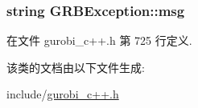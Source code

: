 \subsubsection[{\texorpdfstring{msg}{msg}}]{\setlength{\rightskip}{0pt plus 5cm}string G\+R\+B\+Exception\+::msg\hspace{0.3cm}{\ttfamily [private]}}\hypertarget{classGRBException_aa1220043a118ddcf4d3927f2f1974b07}{}\label{classGRBException_aa1220043a118ddcf4d3927f2f1974b07}


在文件 gurobi\+\_\+c++.\+h 第 725 行定义.



该类的文档由以下文件生成\+:\begin{DoxyCompactItemize}
\item 
include/\hyperlink{gurobi__c_09_09_8h}{gurobi\+\_\+c++.\+h}\end{DoxyCompactItemize}
